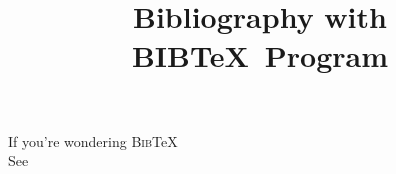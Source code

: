 \documentclass{article}
\title{\bf Bibliography with BIB\TeX ~Program}
\date{}
\begin{document}
	\maketitle
	If you're wondering \textsc{Bib}\TeX \\
	
	See \citet{Knuth-TB}	
	
	\nocite{*}	
	
\end{document}
